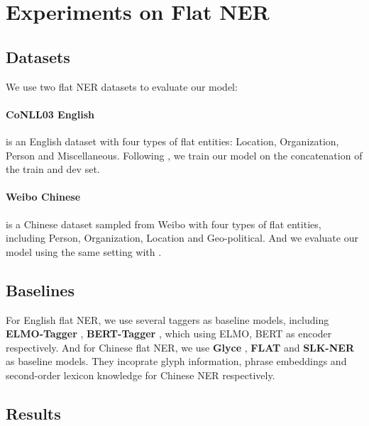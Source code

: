 \documentclass[11pt,a4paper]{article}
\begin{document}
\section{Experiments on Flat NER}
\label{app:flatner}

\subsection{Datasets}

We use two flat NER datasets to evaluate our model:

\paragraph{CoNLL03 English} is an English dataset \citep{tjong-kim-sang-de-meulder-2003-introduction} with four types of flat entities: Location, Organization, Person and Miscellaneous. Following \citet{lin-etal-2019-sequence}, we train our model on the concatenation of the train and dev set.

\paragraph{Weibo Chinese} is a Chinese dataset \citep{peng-dredze-2015-named} sampled from Weibo with four types of flat entities, including Person, Organization, Location and Geo-political. And we evaluate our model using the same setting with \citet{li-etal-2020-flat}.


\subsection{Baselines}

For English flat NER, we use several taggers as baseline models, including  \textbf{ELMO-Tagger} \citep{peters-etal-2018-deep}, \textbf{BERT-Tagger} \citep{peters-etal-2018-deep}, which using ELMO, BERT as encoder respectively. And for Chinese flat NER, we use \textbf{Glyce} \citep{NEURIPS2019_452bf208}, \textbf{FLAT} \citep{li-etal-2020-flat} and \textbf{SLK-NER} \citep{hu2020slk} as baseline models. They incoprate glyph information, phrase embeddings and second-order lexicon knowledge for Chinese NER respectively.






\subsection{Results}
\end{document}
